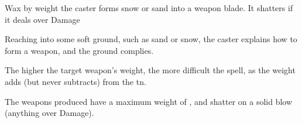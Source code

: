  {\mEarth}%
  {Wax}%
  {\detailed}%
  {by \gls{weight}}%
  {the caster forms snow or sand into a weapon blade. It shatters if it deals over  Damage}%
  {
    Reaching into some soft ground, such as sand or snow, the caster explains how to form a weapon, and the ground complies.

    The higher the target weapon's \gls{weight}, the more difficult the spell, as the \gls{weight} adds (but never subtracts) from the \gls{tn}.

    The weapons produced have a maximum \gls{weight} of , and shatter on a solid blow (anything over  Damage).
  }

